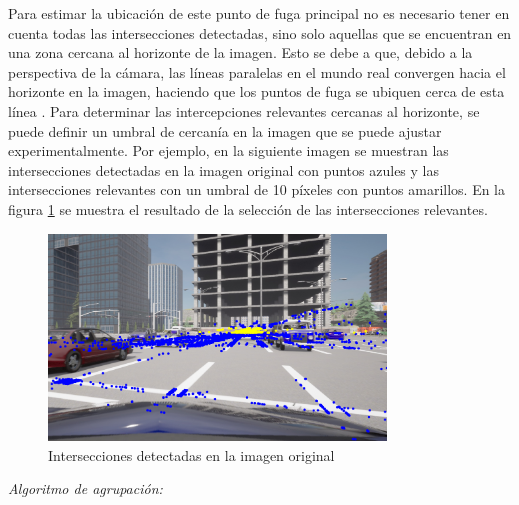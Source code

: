 Para estimar la ubicación de este punto de fuga principal no es necesario tener en cuenta todas las intersecciones detectadas,
sino solo aquellas que se encuentran en una zona cercana al horizonte de la imagen.
Esto se debe a que, debido a la perspectiva de la cámara, las líneas paralelas en el mundo real convergen hacia el horizonte en la imagen,
haciendo que los puntos de fuga se ubiquen cerca de esta línea \cite{hartley2003multiple}.
Para determinar las intercepciones relevantes cercanas al horizonte, se puede definir un umbral de cercanía en la imagen que se puede ajustar experimentalmente.
Por ejemplo, en la siguiente imagen se muestran las intersecciones detectadas en la imagen original con puntos azules
y las intersecciones relevantes con un umbral de 10 píxeles con puntos amarillos.
En la figura \ref{fig:relevantInter} se muestra el resultado de la selección de las intersecciones relevantes. \\
\begin{figure}[!ht]
    \centering
    \includegraphics[width=0.8\textwidth]{img/reticule/relevantInter}
    \caption{Intersecciones detectadas en la imagen original}
    \label{fig:relevantInter}
\end{figure}

\textit{Algoritmo de agrupación:}\\

